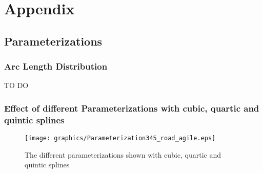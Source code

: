 \chapter{Appendix}\label{cha:appendix}

\section{Parameterizations}
\subsection{Arc Length Distribution}
\label{subsec:arcLengthDistribution}
TO DO
\subsection{Effect of different Parameterizations with cubic, quartic and quintic splines}
\label{subsec:parameterization_degree}

\begin{figure}[H]
  \begin{minipage}[t]{0.9\textwidth}
    \texttt{[image: graphics/Parameterization345\_road\_agile.eps]}
  \end{minipage}
  \caption{The different parameterizations shown with cubic, quartic and quintic splines}
  \label{fig:parameterization_cqq}
\end{figure}





